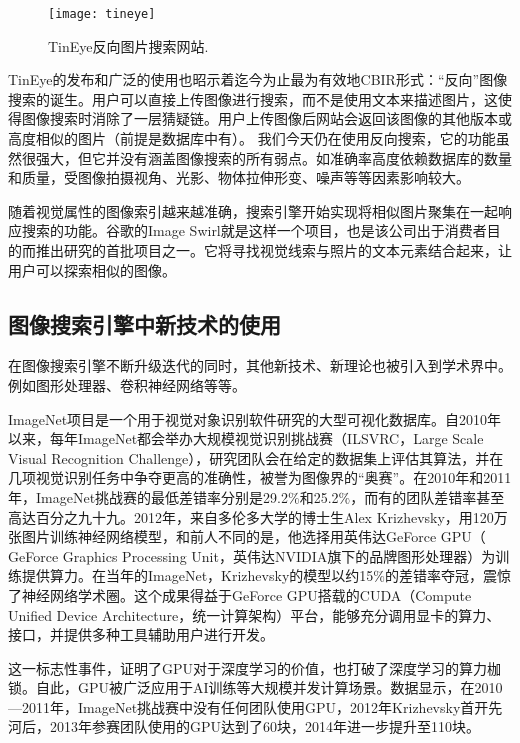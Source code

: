 \documentclass[bachelor_p]{hdu-thesis}
\begin{document}
\begin{figure}[!htb]
  \centering
  \texttt{[image: tineye]}
  \caption{TinEye反向图片搜索网站.}
  \label{fig_tineye}
\end{figure}

TinEye的发布和广泛的使用也昭示着迄今为止最为有效地CBIR形式：“反向”图像搜索的诞生。用户可以直接上传图像进行搜索，而不是使用文本来描述图片，这使得图像搜索时消除了一层猜疑链。用户上传图像后网站会返回该图像的其他版本或高度相似的图片（前提是数据库中有）。 我们今天仍在使用反向搜索，它的功能虽然很强大，但它并没有涵盖图像搜索的所有弱点。如准确率高度依赖数据库的数量和质量，受图像拍摄视角、光影、物体拉伸形变、噪声等等因素影响较大。 

随着视觉属性的图像索引越来越准确，搜索引擎开始实现将相似图片聚集在一起响应搜索的功能。谷歌的Image Swirl就是这样一个项目，也是该公司出于消费者目的而推出研究的首批项目之一。它将寻找视觉线索与照片的文本元素结合起来，让用户可以探索相似的图像。

\subsection{图像搜索引擎中新技术的使用}

在图像搜索引擎不断升级迭代的同时，其他新技术、新理论也被引入到学术界中。例如图形处理器、卷积神经网络等等。

ImageNet项目是一个用于视觉对象识别软件研究的大型可视化数据库。自2010年以来，每年ImageNet都会举办大规模视觉识别挑战赛（ILSVRC，Large Scale Visual Recognition Challenge），研究团队会在给定的数据集上评估其算法，并在几项视觉识别任务中争夺更高的准确性，被誉为图像界的“奥赛”\citep{BaiduImageNet}。在2010年和2011年，ImageNet挑战赛的最低差错率分别是29.2$\%$和25.2$\%$，而有的团队差错率甚至高达百分之九十九。2012年，来自多伦多大学的博士生Alex Krizhevsky，用120万张图片训练神经网络模型，和前人不同的是，他选择用英伟达GeForce GPU（ GeForce Graphics Processing Unit，英伟达NVIDIA旗下的品牌图形处理器）为训练提供算力。在当年的ImageNet，Krizhevsky的模型以约15$\%$的差错率夺冠，震惊了神经网络学术圈。这个成果得益于GeForce GPU搭载的CUDA（Compute Unified Device Architecture，统一计算架构）平台，能够充分调用显卡的算力、接口，并提供多种工具辅助用户进行开发。

这一标志性事件，证明了GPU对于深度学习的价值，也打破了深度学习的算力枷锁。自此，GPU被广泛应用于AI训练等大规模并发计算场景。数据显示，在2010—2011年，ImageNet挑战赛中没有任何团队使用GPU，2012年Krizhevsky首开先河后，2013年参赛团队使用的GPU达到了60块，2014年进一步提升至110块。
\end{document}
